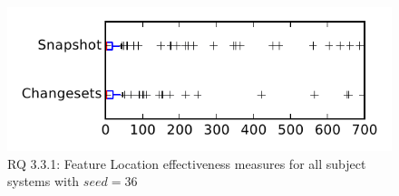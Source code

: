 
\begin{figure}
\centering
\includegraphics[height=0.4\textheight]{figures/flt_seed/rq1_tiny_36}
\caption{RQ 3.3.1: Feature Location effectiveness measures for all subject systems with $seed=36$}
\label{fig:flt_seed:rq1:tiny}
\end{figure}
